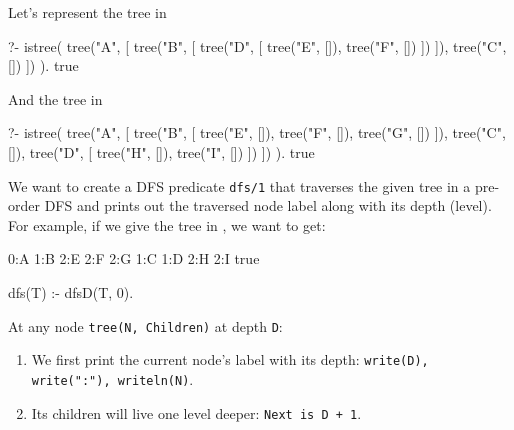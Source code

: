 Let's represent the tree in 

\begin{codeblock}
?- istree(
    tree("A",
         [ tree("B",
                [ tree("D",
                       [ tree("E", []),
                         tree("F", [])
                       ])
                ]),
           tree("C", [])
         ])
  ).
true
\end{codeblock}

And the tree in 
\begin{codeblock}
?- istree(
    tree("A",
         [ tree("B",
                [ tree("E", []),
                  tree("F", []),
                  tree("G", [])
                ]),
           tree("C", []),
           tree("D",
                [ tree("H", []),
                  tree("I", [])
                ])
         ])
  ).
true
\end{codeblock}


We want to create a DFS predicate \texttt{dfs/1} that traverses the given tree in a pre-order DFS and prints out the traversed node label along with its depth (level). For example, if we give the tree in , we want to get:
\begin{codeblock}
0:A
1:B
2:E
2:F
2:G
1:C
1:D
2:H
2:I
true
\end{codeblock}




\begin{codeblock}
dfs(T) :- 
    dfsD(T, 0).
\end{codeblock}


At any node \texttt{tree(N, Children)} at depth \texttt{D}:
\begin{enumerate}
    \item We first print the current node's label with its depth: \texttt{write(D), write(":"), writeln(N)}.
    \item Its children will live one level deeper: \texttt{Next is D + 1}.
\end{enumerate}

